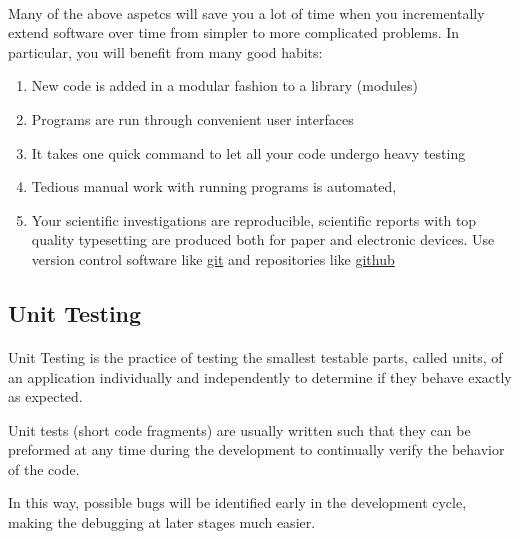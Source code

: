 \documentclass[%
oneside,                 %
final,                   %
10pt]{article}
\begin{document}
\paragraph{}
Many of the above aspetcs  will save you a lot of time when you incrementally extend software over time from simpler to more complicated problems. In particular, you will benefit from many good habits:
\begin{enumerate}
\item New code is added in a modular fashion to a library (modules)

\item Programs are run through convenient user interfaces

\item It takes one quick command to let all your code undergo heavy testing 

\item Tedious manual work with running programs is automated,

\item Your scientific investigations are reproducible, scientific reports with top quality typesetting are produced both for paper and electronic devices. Use version control software like \href{{https://git-scm.com/}}{git} and repositories like \href{{https://github.com/}}{github}
\end{enumerate}

\noindent



\subsection*{Unit Testing}

\paragraph{}
Unit Testing is the practice of testing the smallest testable parts,
called units, of an application individually and independently to
determine if they behave exactly as expected. 

Unit tests (short code
fragments) are usually written such that they can be preformed at any
time during the development to continually verify the behavior of the
code. 

In this way, possible bugs will be identified early in the
development cycle, making the debugging at later stages much
easier.
\end{document}
